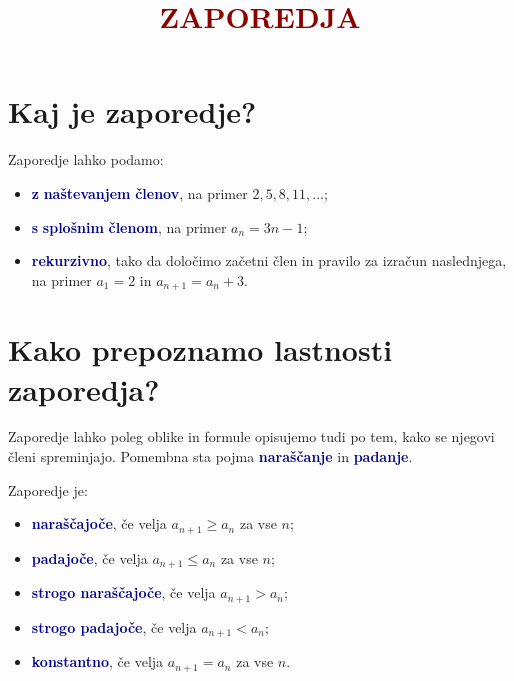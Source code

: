 \documentclass[12pt,a4paper]{article}
\title{\textcolor{darkred}{ZAPOREDJA}}
\date{}
\begin{document}
\maketitle


\section{Kaj je zaporedje?}

\noindent{}

\vspace{0.5cm}

Zaporedje lahko podamo:
\begin{itemize}
    \item \textcolor{darkblue}{\textbf{z}} \textcolor{darkblue}{\textbf{naštevanjem}} \textcolor{darkblue}{\textbf{členov}}, na primer $2, 5, 8, 11, \ldots$;
    \item \textcolor{darkblue}{\textbf{s}} \textcolor{darkblue}{\textbf{splošnim}} \textcolor{darkblue}{\textbf{členom}}, na primer $a_n=3n-1$;
    \item \textcolor{darkblue}{\textbf{rekurzivno}}, tako da določimo začetni člen in pravilo za izračun naslednjega, na primer $a_1=2$ in $a_{n+1}=a_n+3$.
\end{itemize}

\section{Kako prepoznamo lastnosti zaporedja?}

Zaporedje lahko poleg oblike in formule opisujemo tudi po tem, kako se njegovi členi spreminjajo. Pomembna sta pojma \textcolor{darkblue}{\textbf{naraščanje}} in \textcolor{darkblue}{\textbf{padanje}}.

\vspace{0.5cm}

Zaporedje je:
\begin{itemize}  
    \item \textcolor{darkblue}{\textbf{naraščajoče}}, če velja $a_{n+1} \ge a_n$ za vse $n$;
    \item \textcolor{darkblue}{\textbf{padajoče}}, če velja $a_{n+1} \le a_n$ za vse $n$;
    \item \textcolor{darkblue}{\textbf{strogo naraščajoče}}, če velja $a_{n+1} > a_n$;
    \item \textcolor{darkblue}{\textbf{strogo padajoče}}, če velja $a_{n+1} < a_n$;
    \item \textcolor{darkblue}{\textbf{konstantno}}, če velja $a_{n+1}=a_n$ za vse $n$.
\end{itemize}
\end{document}
